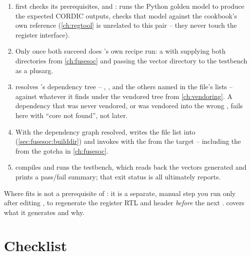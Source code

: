 \begin{enumerate}
  \item {} first checks its prerequisites,  and
        :  runs the Python golden model to
        produce the expected CORDIC outputs,  checks that
        model against the cookbook's own reference (\cref{ch:regtool} is
        unrelated to this pair -- they never touch the register interface).
  \item Only once both succeed does 's own recipe run: a
         with 
        supplying both  directories from
        \cref{ch:fusesoc} and  passing the vector
        directory to the testbench as a plusarg.
  \item \FuseSoC resolves 's dependency tree
        -- , ,  and
        the others named in the  file's  lists --
        against whatever it finds under the vendored  tree
        from \cref{ch:vendoring}. A dependency that was never vendored, or
        was vendored into the wrong , fails here with
        ``core not found'', not later.
  \item With the dependency graph resolved, \FuseSoC writes the file list
        into 
        (\cref{sec:fusesoc:builddir}) and invokes  with the
         from the  target -- including the
         from the gotcha in \cref{ch:fusesoc}.
  \item {} compiles and runs the testbench, which reads back
        the vectors  generated and prints a pass/fail summary;
        that exit status is all  ultimately reports.
\end{enumerate}

\begin{tipbox}{Where  fits}
 is not a prerequisite of : it is a separate, manual
step you run only after editing , to
regenerate the register RTL and header \emph{before} the next
.  covers what it generates and why.
\end{tipbox}

\section{Checklist}
\label{sec:makefiles:checklist}


